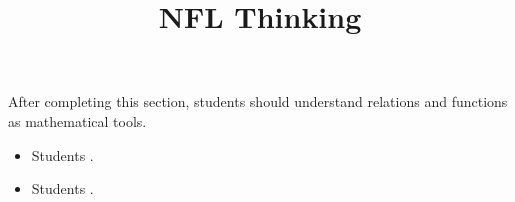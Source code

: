\documentclass{ximera}
\title{NFL Thinking}
\begin{document}
\begin{abstract}
\end{abstract}

\maketitle

\begin{sectionOutcomes}

After completing this section, students should understand relations and functions as mathematical tools. 

\begin{itemize}
\item Students .
\item Students .
\end{itemize}

\end{sectionOutcomes}
\end{document}
